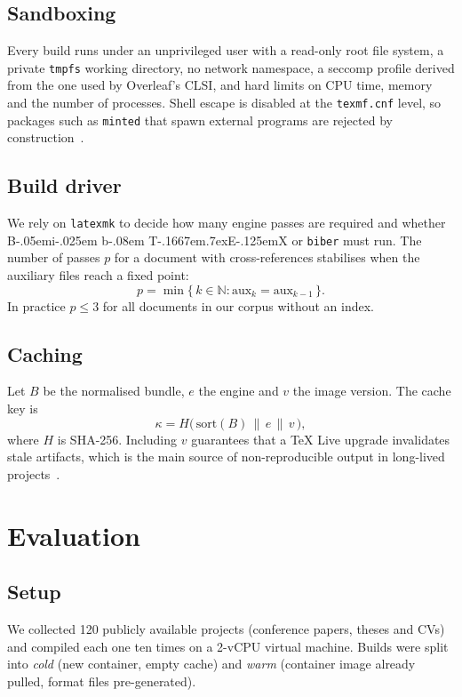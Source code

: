 \documentclass[conference]{IEEEtran}
\def\BibTeX{{\rm B\kern-.05em{\sc i\kern-.025em b}\kern-.08em
    T\kern-.1667em\lower.7ex\hbox{E}\kern-.125emX}}
\begin{document}
\subsection{Sandboxing}
Every build runs under an unprivileged user with a read-only root file
system, a private \texttt{tmpfs} working directory, no network namespace, a
seccomp profile derived from the one used by Overleaf's CLSI, and hard limits
on CPU time, memory and the number of processes. Shell escape is disabled at
the \texttt{texmf.cnf} level, so packages such as \texttt{minted} that spawn
external programs are rejected by construction~\cite{nist2017container}.

\subsection{Build driver}
We rely on \texttt{latexmk} to decide how many engine passes are required and
whether \BibTeX{} or \texttt{biber} must run. The number of passes $p$ for a
document with cross-references stabilises when the auxiliary files reach a
fixed point:
\begin{equation}
  p = \min\{\, k \in \mathbb{N} : \mathrm{aux}_k = \mathrm{aux}_{k-1} \,\}.
  \label{eq:fixpoint}
\end{equation}
In practice $p \le 3$ for all documents in our corpus without an index.

\subsection{Caching}
Let $B$ be the normalised bundle, $e$ the engine and $v$ the image version.
The cache key is
\begin{equation}
  \kappa = H\big(\,\mathrm{sort}(B) \,\|\, e \,\|\, v\,\big),
\end{equation}
where $H$ is SHA-256. Including $v$ guarantees that a \TeX{} Live upgrade
invalidates stale artifacts, which is the main source of non-reproducible
output in long-lived projects~\cite{knuth1986texbook}.

\section{Evaluation}
\subsection{Setup}
We collected 120 publicly available projects (conference papers, theses and
CVs) and compiled each one ten times on a 2-vCPU virtual machine. Builds were
split into \emph{cold} (new container, empty cache) and \emph{warm} (container
image already pulled, format files pre-generated).
\end{document}
